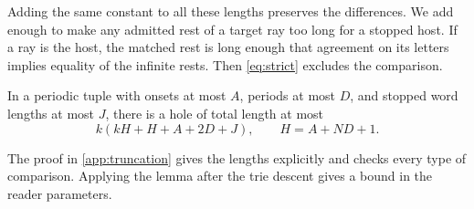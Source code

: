 Adding the same constant to all these lengths preserves the
differences. We add enough to make any admitted rest of a target ray too
long for a stopped host. If a ray is the host, the matched rest is long
enough that agreement on its letters implies equality of the infinite
rests. Then \eqref{eq:strict} excludes the comparison.

\begin{lemma}\label{lem:truncation}
In a periodic tuple with onsets at most $A$, periods at most $D$,
and stopped word lengths at most $J$, there is a hole of total length at
most
\[
     k(kH+H+A+2D+J),\qquad H=A+ND+1.
\]
\end{lemma}

The proof in \cref{app:truncation} gives the lengths explicitly and
checks every type of comparison. Applying the lemma after the trie
descent gives a bound in the reader parameters.
